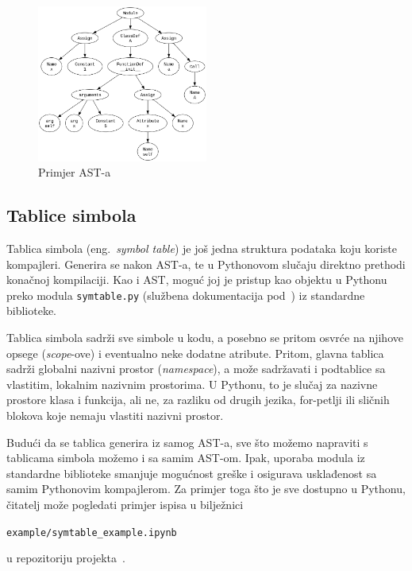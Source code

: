 \begin{figure}[hb]
    \label{fig:ast-example}
    \centering
    \includegraphics[width=0.5\textwidth]{assets/ast-example.png}
    \caption{Primjer AST-a}
\end{figure}

\subsection{Tablice simbola}
Tablica simbola (eng.\ \textsl{symbol table}) je još jedna struktura podataka koju koriste kompajleri. Generira se nakon AST-a, te u Pythonovom slučaju direktno prethodi konačnoj kompilaciji. Kao i AST, moguć joj
je pristup kao objektu u Pythonu preko modula \texttt{symtable.py} (službena dokumentacija pod~\cite{docs:symtable}) iz standardne biblioteke. 

Tablica simbola sadrži sve simbole u kodu, a posebno se pritom osvrće na njihove opsege (\emph{scope}-ove) i eventualno neke dodatne atribute. Pritom, glavna tablica sadrži globalni nazivni prostor (\emph{namespace}), 
a može sadržavati i podtablice sa vlastitim, lokalnim nazivnim prostorima. U Pythonu, to je slučaj za nazivne prostore klasa i funkcija, ali ne, za razliku od drugih jezika, for-petlji ili sličnih blokova koje nemaju vlastiti 
nazivni prostor.

Budući da se tablica generira iz samog AST-a, sve što možemo napraviti s tablicama simbola možemo i sa samim AST-om. Ipak, uporaba modula iz standardne biblioteke smanjuje mogućnost greške i osigurava usklađenost sa samim 
Pythonovim kompajlerom. Za primjer toga što je sve dostupno u Pythonu, čitatelj može pogledati primjer ispisa u bilježnici
\begin{center}
\texttt{example/symtable_example.ipynb}
\end{center}
u repozitoriju projekta~\cite{repo}.
